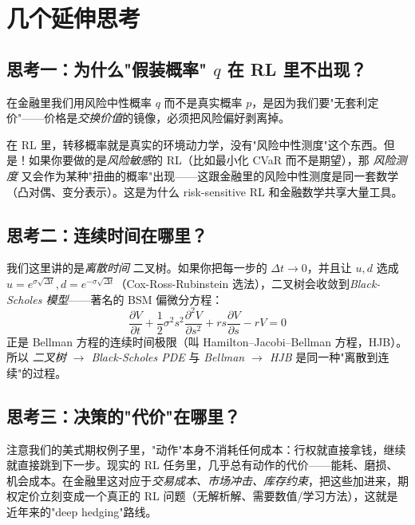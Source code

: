 \documentclass[11pt,a4paper]{ctexart}
\newcommand{\1}{\mathbf{1}}
\begin{document}
\section{几个延伸思考}

\subsection{思考一：为什么"假装概率" $q$ 在 RL 里不出现？}

在金融里我们用风险中性概率 $q$ 而不是真实概率 $p$，是因为我们要"无套利定价"——价格是\emph{交换价值}的镜像，必须把风险偏好剥离掉。

在 RL 里，转移概率就是真实的环境动力学，没有"风险中性测度"这个东西。但是！如果你要做的是\emph{风险敏感}的 RL（比如最小化 CVaR 而不是期望），那 \emph{风险测度} 又会作为某种"扭曲的概率"出现——这跟金融里的风险中性测度是同一套数学（凸对偶、变分表示）。这是为什么 risk-sensitive RL 和金融数学共享大量工具。

\subsection{思考二：连续时间在哪里？}

我们这里讲的是\emph{离散时间} 二叉树。如果你把每一步的 $\Delta t \to 0$，并且让 $u, d$ 选成 $u = e^{\sigma\sqrt{\Delta t}}, d = e^{-\sigma\sqrt{\Delta t}}$（Cox-Ross-Rubinstein 选法），二叉树会收敛到\emph{Black-Scholes 模型}——著名的 BSM 偏微分方程：
\[
\frac{\partial V}{\partial t} + \frac{1}{2}\sigma^2 s^2 \frac{\partial^2 V}{\partial s^2} + rs\frac{\partial V}{\partial s} - rV = 0
\]
正是 Bellman 方程的连续时间极限（叫 Hamilton–Jacobi–Bellman 方程，HJB）。所以 \emph{二叉树 $\to$ Black-Scholes PDE} 与 \emph{Bellman $\to$ HJB} 是同一种"离散到连续"的过程。

\subsection{思考三：决策的"代价"在哪里？}

注意我们的美式期权例子里，"动作"本身不消耗任何成本：行权就直接拿钱，继续就直接跳到下一步。现实的 RL 任务里，几乎总有动作的代价——能耗、磨损、机会成本。在金融里这对应于\emph{交易成本、市场冲击、库存约束}，把这些加进来，期权定价立刻变成一个真正的 RL 问题（无解析解、需要数值/学习方法），这就是近年来的"deep hedging"路线。

\end{document}

